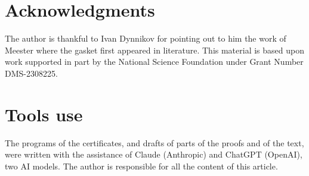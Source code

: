 \documentclass[11pt]{amsart}
\theoremstyle{definition}
\theoremstyle{remark}
\begin{document}
\section*{Acknowledgments}
The author is thankful to Ivan Dynnikov for pointing out to him the work of Meester where the gasket first appeared in literature.
This material is based upon work supported in part by the National Science Foundation under Grant Number DMS-2308225.

\section*{Tools use}
The programs of the certificates, and drafts of parts of the proofs and of the text, were written with the assistance of Claude (Anthropic) and ChatGPT (OpenAI), two AI models. 
The author is responsible for all the content of this article.
\end{document}
